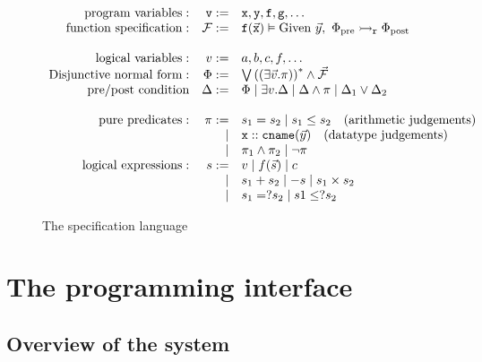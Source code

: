 \begin{figure}[htp]
$$\begin{array}{rrl}
    \text{program variables}: & \texttt{v} :=        
        & \texttt{x},\texttt{y},\texttt{f},\texttt{g},\ldots\\
    \text{function specification}: & \mathcal{F} := 
        & \texttt{f}(\vec{\texttt{x}}) \vDash \textrm{Given } \vec{y}, \  \Phi_{\text{pre}} \rightarrowtail_{\mathtt{r} } \Phi_{\text{post}} \\
    \\
    \text{logical variables}: & v := 
        & a, b,c, f, \ldots \\
    \text{Disjunctive normal form}: &\Phi := 
        & \bigvee \left((\exists \vec{v}. \pi)\right)^{*} \wedge \vec{\mathcal{F}} \\
    \text{pre/post condition} & \Delta := 
        & \Phi \mid \exists v. \Delta \mid \Delta \wedge \pi \mid \Delta_1 \vee \Delta_2 \\
    \\
    \text{pure predicates}: & \pi := 
        & s_1 = s_2 \mid s_1 \le s_2 \text{\quad (arithmetic judgements)} \\
    &\mid& \texttt{x}::\texttt{cname}(\vec{y}) \text{\quad (datatype judgements)} \\
    &\mid& \pi_1 \wedge \pi_2 \mid \neg \pi \\
    \text{logical expressions}: & s := 
        & v \mid f(\vec{s}) \mid c \\
    &\mid& s_1 + s_2 \mid - s \mid s_1 \times s_2 \\
    &\mid& s_1 =? s_2 \mid s1 \le? s_2
\end{array}$$
    \caption{The specification language}
    \label{fig:AssASTcur}
\end{figure}


\section{The programming interface}

\subsection{Overview of the system}

